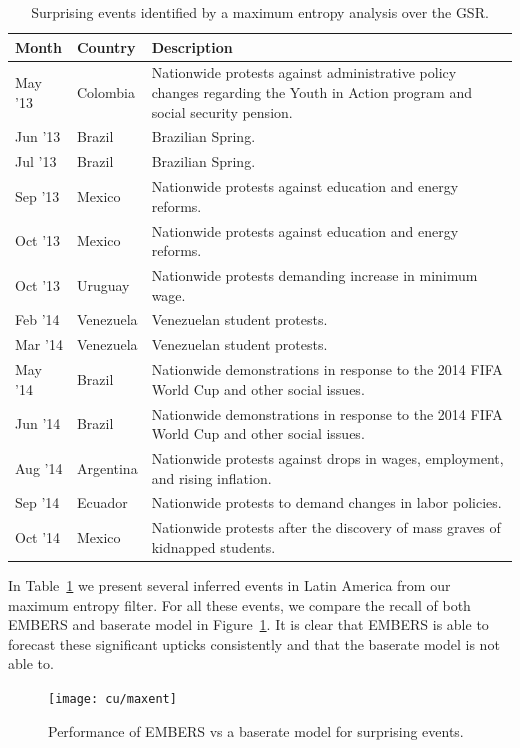 \begin{table}
\caption{Surprising events identified by a maximum entropy analysis
over the GSR.}
\renewcommand{\arraystretch}{1.1}
 \centering
 \begin{tabular}{|l|l|m{5cm}|}
 \hline
Month     & Country      & Description \\ \hline
May '13  &  Colombia	 &  Nationwide protests against administrative policy changes regarding the
Youth in Action program and social security pension. \\ \hline
Jun '13  &  Brazil  &  Brazilian Spring. \\ \hline
Jul '13  &  Brazil  &  Brazilian Spring. \\ \hline
Sep '13  &  Mexico  &  Nationwide protests against education and energy 
reforms. \\ \hline
Oct '13  &  Mexico  &  Nationwide protests against education and energy 
reforms. \\ \hline
Oct '13  &  Uruguay  &  Nationwide protests demanding increase in minimum 
wage. \\ \hline
Feb '14  &  Venezuela	  &  Venezuelan student protests. \\ \hline
Mar '14  &  Venezuela  &  	Venezuelan student protests. \\ \hline
May '14  &  Brazil  &  Nationwide demonstrations in response to the 
2014 FIFA World Cup and other social issues. \\ \hline
Jun '14  &  Brazil  &  Nationwide demonstrations in response to the 2014 FIFA World Cup and other social issues. \\ \hline
Aug '14  &  Argentina	  &  Nationwide protests against drops in wages, employment, and rising inflation. \\ \hline
Sep '14  &  Ecuador  &  Nationwide protests to demand changes in 
labor policies. \\ \hline
Oct '14  &  Mexico  &  Nationwide protests after the discovery of mass 
graves of kidnapped students. \\ \hline
\end{tabular}
\label{tab:maxentEvents}
\end{table}

In Table~\ref{tab:maxentEvents} we present several inferred events in Latin America from our maximum entropy
filter.
For all these events, we compare the recall of both EMBERS and baserate model
in Figure~\ref{fig:maxent}.
It is clear that EMBERS is able to forecast these significant upticks consistently and that the baserate model is not able to.

\begin{figure} %
\centering
\texttt{[image: cu/maxent]}
\caption{Performance of EMBERS vs a baserate model for surprising events.}
\label{fig:maxent}
\end{figure}
